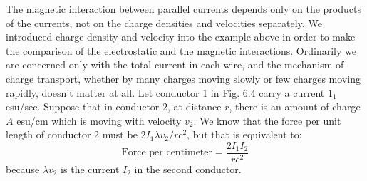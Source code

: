 The magnetic interaction between parallel currents depends only
on the products of the currents, not on the charge densities and
velocities separately. We introduced charge density and velocity into
the example above in order to make the comparison of the electrostatic
and the magnetic interactions. Ordinarily we are concerned
only with the total current in each wire, and the mechanism of charge
transport, whether by many charges moving slowly or few charges
moving rapidly, doesn't matter at all. Let conductor 1 in Fig. 6.4
carry a current $1_1$ esu/sec. Suppose that in conductor 2, at distance $r$,
there is an amount of charge $A$ esu/cm which is moving with
velocity $v_2$. We know that the force per unit length of conductor
2 must be $2 I_1\lambda v_2/rc^2$, but that is equivalent to:
\begin{equation}
  \text{Force per centimeter} = \frac{2I_1I_2}{rc^2}
\end{equation}
because $\lambda v_2$ is the current $I_2$ in the second conductor.

